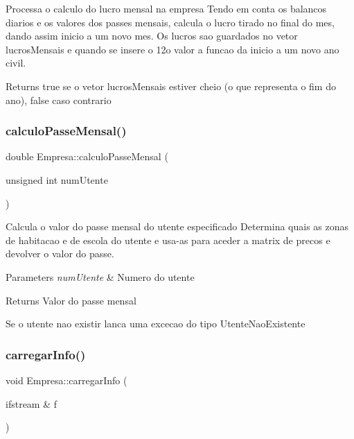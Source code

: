 Processa o calculo do lucro mensal na empresa Tendo em conta os balancos diarios e os valores dos passes mensais, calcula o lucro tirado no final do mes, dando assim inicio a um novo mes. Os lucros sao guardados no vetor lucros\+Mensais e quando se insere o 12o valor a funcao da inicio a um novo ano civil. 

\begin{DoxyReturn}{Returns}
true se o vetor lucros\+Mensais estiver cheio (o que representa o fim do ano), false caso contrario 
\end{DoxyReturn}
\mbox{\label{class_empresa_a1fceee003267c33641d908f4b3d4d3f2}} 
\subsubsection{\texorpdfstring{calculo\+Passe\+Mensal()}{calculoPasseMensal()}}
{\footnotesize\ttfamily double Empresa\+::calculo\+Passe\+Mensal (\begin{DoxyParamCaption}\item[{unsigned int}]{num\+Utente }\end{DoxyParamCaption})}



Calcula o valor do passe mensal do utente especificado Determina quais as zonas de habitacao e de escola do utente e usa-\/as para aceder a matrix de precos e devolver o valor do passe. 


\begin{DoxyParams}{Parameters}
{\em num\+Utente} & Numero do utente\\
\hline
\end{DoxyParams}
\begin{DoxyReturn}{Returns}
Valor do passe mensal
\end{DoxyReturn}
Se o utente nao existir lanca uma excecao do tipo Utente\+Nao\+Existente \mbox{\label{class_empresa_a3561dcd8cfee00b63e7fd48207c7831f}} 
\subsubsection{\texorpdfstring{carregar\+Info()}{carregarInfo()}}
{\footnotesize\ttfamily void Empresa\+::carregar\+Info (\begin{DoxyParamCaption}\item[{ifstream \&}]{f }\end{DoxyParamCaption})}



